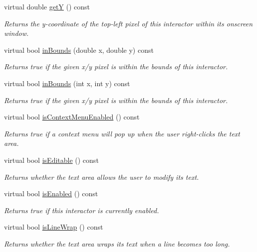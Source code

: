 \begin{DoxyCompactItemize}
virtual double \mbox{\hyperlink{classGInteractor_aafa51c7f8f38a09febbb9ce7853f77b4}{getY}} () const
\begin{DoxyCompactList}\small\item\em Returns the y-\/coordinate of the top-\/left pixel of this interactor within its onscreen window. \end{DoxyCompactList}\item 
virtual bool \mbox{\hyperlink{classGInteractor_afc480f652b8c5f1fb255e2269ce68879}{in\+Bounds}} (double x, double y) const
\begin{DoxyCompactList}\small\item\em Returns true if the given x/y pixel is within the bounds of this interactor. \end{DoxyCompactList}\item 
virtual bool \mbox{\hyperlink{classGInteractor_ae6d7982c1c627b677a5e776ca86118ed}{in\+Bounds}} (int x, int y) const
\begin{DoxyCompactList}\small\item\em Returns true if the given x/y pixel is within the bounds of this interactor. \end{DoxyCompactList}\item 
virtual bool \mbox{\hyperlink{classGTextArea_a80f9fe3b6f725182b294886f57cc1689}{is\+Context\+Menu\+Enabled}} () const
\begin{DoxyCompactList}\small\item\em Returns true if a context menu will pop up when the user right-\/clicks the text area. \end{DoxyCompactList}\item 
virtual bool \mbox{\hyperlink{classGTextArea_a012b5afb54e037e6c5498cf0932a521b}{is\+Editable}} () const
\begin{DoxyCompactList}\small\item\em Returns whether the text area allows the user to modify its text. \end{DoxyCompactList}\item 
virtual bool \mbox{\hyperlink{classGInteractor_aacb819fb241851fd9fc045271baa4034}{is\+Enabled}} () const
\begin{DoxyCompactList}\small\item\em Returns true if this interactor is currently enabled. \end{DoxyCompactList}\item 
virtual bool \mbox{\hyperlink{classGTextArea_ae09e72290b6e8a23bcc77752da6dffa5}{is\+Line\+Wrap}} () const
\begin{DoxyCompactList}\small\item\em Returns whether the text area wraps its text when a line becomes too long. \end{DoxyCompactList}\item 

\end{DoxyCompactItemize}
